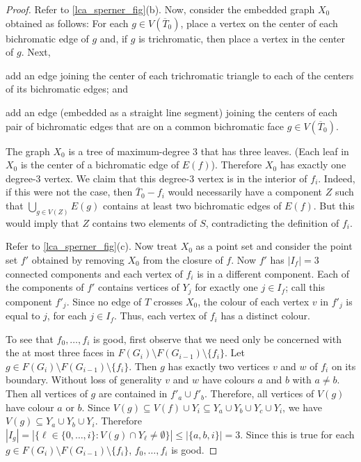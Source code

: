 \documentclass{patmorin}
\begin{document}
\begin{proof}
  Refer to \cref{lca_sperner_fig}(b).
  Now, consider the embedded graph $X_0$ obtained as follows: For each $g\in V(\overline{T}_0)$, place a vertex on the center of each bichromatic edge of $g$ and, if $g$ is trichromatic, then place a vertex in the center of $g$.  Next,
   \begin{compactenum}
    \item add an edge joining the center of each trichromatic triangle to each of the centers of its bichromatic edges; and
    \item add an edge (embedded as a straight line segment) joining the centers of each pair of bichromatic edges that are on a common bichromatic face $g\in V(\overline{T}_0)$.
  \end{compactenum}
  The graph $X_0$ is a tree of maximum-degree $3$ that has three leaves.  (Each leaf in $X_0$ is the center of a bichromatic edge of $E(f)$). Therefore $X_0$ has exactly one degree-$3$ vertex.  We claim that this degree-$3$ vertex is in the interior of $f_i$.  Indeed, if this were not the case,  then $\overline{T}_0-f_i$ would necessarily have a component $Z$ such that $\bigcup_{g\in V(Z)} E(g)$ contains at least two bichromatic edges of $E(f)$.  But this would imply that $Z$ contains two elements of $S$, contradicting the definition of $f_i$.
  
  Refer to \cref{lca_sperner_fig}(c).
  Now treat $X_0$ as a point set and consider the point set $f'$ obtained by removing $X_0$ from the closure of $f$. Now $f'$ has $|I_f|=3$ connected components and each vertex of $f_i$ is in a different component.  Each of the components of $f'$ contains vertices of $Y_j$ for exactly one $j\in I_f$; call this component $f'_j$.  Since no edge of $T$ crosses $X_0$, the colour of each vertex $v$ in $f'_j$ is equal to $j$, for each $j\in I_f$.  Thus, each vertex of $f_i$ has a distinct colour.

  To see that $f_0,\ldots,f_i$ is good, first observe that we need only be concerned with the at most three faces in $F(G_i)\setminus F(G_{i-1})\setminus\{f_i\}$.  Let $g\in F(G_i)\setminus F(G_{i-1})\setminus\{f_i\}$.  Then $g$ has exactly two vertices $v$ and $w$ of $f_i$ on its boundary.  Without loss of generality $v$ and $w$ have colours $a$ and $b$ with $a\neq b$.  Then all vertices of $g$ are contained in $f'_a\cup f'_b$. Therefore, all vertices of $V(g)$ have colour $a$ or $b$.  Since $V(g)\subseteq V(f) \cup Y_i\subseteq Y_a\cup Y_b\cup Y_c \cup Y_i$, we have  $V(g)\subseteq Y_a\cup Y_b\cup Y_i$.  Therefore $|I_g|=|\{\ell\in\{0,\ldots,i\}:V(g)\cap Y_{\ell}\neq\emptyset\}| \le |\{a,b,i\}| = 3$. Since this is true for each $g\in F(G_i)\setminus F(G_{i-1})\setminus\{f_i\}$, $f_0,\ldots,f_i$ is good.
\end{proof}
\end{document}
